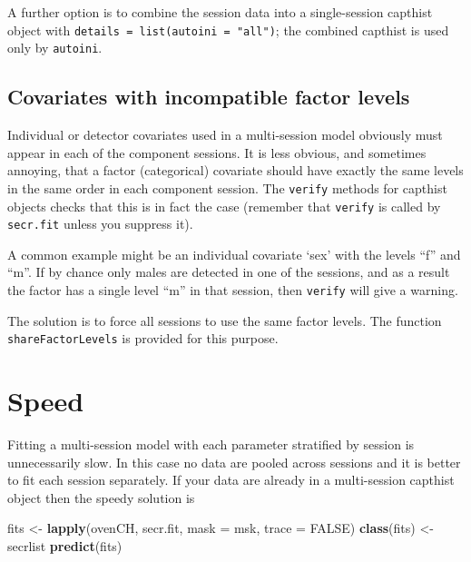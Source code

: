 \documentclass[
]{book}
\newenvironment{Shaded}{\begin{snugshade}}{\end{snugshade}}
\newcommand{\AttributeTok}[1]{\textcolor[rgb]{0.13,0.29,0.53}{#1}}
\newcommand{\ConstantTok}[1]{\textcolor[rgb]{0.56,0.35,0.01}{#1}}
\newcommand{\FunctionTok}[1]{\textcolor[rgb]{0.13,0.29,0.53}{\textbf{#1}}}
\newcommand{\NormalTok}[1]{#1}
\newcommand{\OtherTok}[1]{\textcolor[rgb]{0.56,0.35,0.01}{#1}}
\newcommand{\StringTok}[1]{\textcolor[rgb]{0.31,0.60,0.02}{#1}}
\begin{document}
A further option is to combine the session data into a single-session capthist object with \texttt{details\ =\ list(autoini\ =\ "all")}; the combined capthist is used only by \texttt{autoini}.

\subsection{Covariates with incompatible factor levels}\label{covariates-with-incompatible-factor-levels}

Individual or detector covariates used in a multi-session model obviously must appear in each of the component sessions. It is less obvious, and sometimes annoying, that a factor (categorical) covariate should have exactly the same levels in the same order in each component session. The \texttt{verify} methods for capthist objects checks that this is in fact the case (remember that \texttt{verify} is called by \texttt{secr.fit} unless you suppress it).

A common example might be an individual covariate `sex' with the levels ``f'' and ``m''. If by chance only males are detected in one of the sessions, and as a result the factor has a single level ``m'' in that session, then \texttt{verify} will give a warning.

The solution is to force all sessions to use the same factor levels. The function \texttt{shareFactorLevels} is provided for this purpose.

\section{Speed}\label{fasterfitting}

Fitting a multi-session model with each parameter stratified by session is unnecessarily slow. In this case no data are pooled across sessions and it is better to fit each session separately. If your data are already in a multi-session capthist object then the speedy solution is

\begin{Shaded}
\begin{Highlighting}[]
\NormalTok{fits }\OtherTok{\textless{}{-}} \FunctionTok{lapply}\NormalTok{(ovenCH, secr.fit, }\AttributeTok{mask =}\NormalTok{ msk, }\AttributeTok{trace =} \ConstantTok{FALSE}\NormalTok{)}
\FunctionTok{class}\NormalTok{(fits) }\OtherTok{\textless{}{-}} \StringTok{\textquotesingle{}secrlist\textquotesingle{}}
\FunctionTok{predict}\NormalTok{(fits)}
\end{Highlighting}
\end{Shaded}
\end{document}
